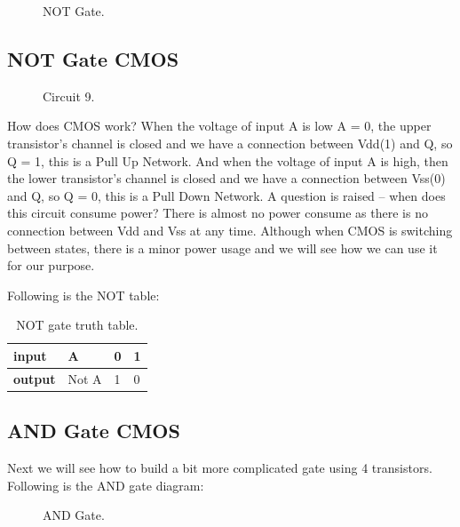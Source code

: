 \begin{figure}[!ht]
    \centering
    
    \caption{NOT Gate.} \label{fig:not}
\end{figure}

\subsection{ NOT Gate CMOS}

\begin{figure}[!ht]
    \centering
    
    \caption{Circuit 9.} \label{fig:circuit9}
\end{figure}

How does CMOS work? When the voltage of input A is low A = 0, the upper transistor's channel is closed and we have a connection between Vdd(1) and Q, so Q = 1, this is a Pull Up Network. And when the voltage of input A is high, then the lower transistor's channel is closed and we have a connection between Vss(0) and Q, so Q = 0, this is a Pull Down Network. A question is raised – when does this circuit consume power? There is almost no power consume as there is no connection between Vdd and Vss at any time. Although when CMOS is switching between states, there is a minor power usage and we will see how we can use it for our purpose.

Following is the NOT table:

\begin{table}
    \centering
    \caption{NOT gate truth table.}
    \begin{tabular}{llll}
        \toprule
        \textbf{input}  & A     & 0 & 1 \\ \midrule
        \textbf{output} & Not A & 1 & 0 \\ \bottomrule
    \end{tabular}
\end{table} 

\subsection{ AND Gate CMOS}

Next we will see how to build a bit more complicated gate using 4 transistors. Following is the AND gate diagram:

\begin{figure}[!ht]
    \centering
    
    \caption{AND Gate.} \label{fig:and}
\end{figure}

